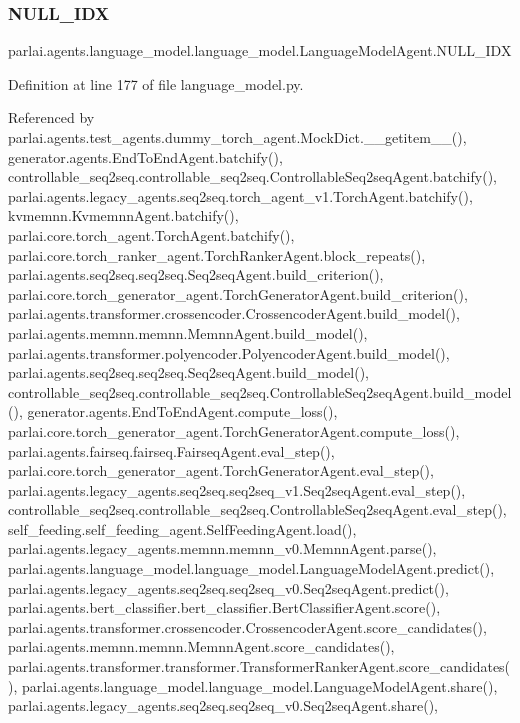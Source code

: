 \subsubsection{\texorpdfstring{N\+U\+L\+L\+\_\+\+I\+DX}{NULL\_IDX}}
{\footnotesize\ttfamily parlai.\+agents.\+language\+\_\+model.\+language\+\_\+model.\+Language\+Model\+Agent.\+N\+U\+L\+L\+\_\+\+I\+DX}



Definition at line 177 of file language\+\_\+model.\+py.



Referenced by parlai.\+agents.\+test\+\_\+agents.\+dummy\+\_\+torch\+\_\+agent.\+Mock\+Dict.\+\_\+\+\_\+getitem\+\_\+\+\_\+(), generator.\+agents.\+End\+To\+End\+Agent.\+batchify(), controllable\+\_\+seq2seq.\+controllable\+\_\+seq2seq.\+Controllable\+Seq2seq\+Agent.\+batchify(), parlai.\+agents.\+legacy\+\_\+agents.\+seq2seq.\+torch\+\_\+agent\+\_\+v1.\+Torch\+Agent.\+batchify(), kvmemnn.\+Kvmemnn\+Agent.\+batchify(), parlai.\+core.\+torch\+\_\+agent.\+Torch\+Agent.\+batchify(), parlai.\+core.\+torch\+\_\+ranker\+\_\+agent.\+Torch\+Ranker\+Agent.\+block\+\_\+repeats(), parlai.\+agents.\+seq2seq.\+seq2seq.\+Seq2seq\+Agent.\+build\+\_\+criterion(), parlai.\+core.\+torch\+\_\+generator\+\_\+agent.\+Torch\+Generator\+Agent.\+build\+\_\+criterion(), parlai.\+agents.\+transformer.\+crossencoder.\+Crossencoder\+Agent.\+build\+\_\+model(), parlai.\+agents.\+memnn.\+memnn.\+Memnn\+Agent.\+build\+\_\+model(), parlai.\+agents.\+transformer.\+polyencoder.\+Polyencoder\+Agent.\+build\+\_\+model(), parlai.\+agents.\+seq2seq.\+seq2seq.\+Seq2seq\+Agent.\+build\+\_\+model(), controllable\+\_\+seq2seq.\+controllable\+\_\+seq2seq.\+Controllable\+Seq2seq\+Agent.\+build\+\_\+model(), generator.\+agents.\+End\+To\+End\+Agent.\+compute\+\_\+loss(), parlai.\+core.\+torch\+\_\+generator\+\_\+agent.\+Torch\+Generator\+Agent.\+compute\+\_\+loss(), parlai.\+agents.\+fairseq.\+fairseq.\+Fairseq\+Agent.\+eval\+\_\+step(), parlai.\+core.\+torch\+\_\+generator\+\_\+agent.\+Torch\+Generator\+Agent.\+eval\+\_\+step(), parlai.\+agents.\+legacy\+\_\+agents.\+seq2seq.\+seq2seq\+\_\+v1.\+Seq2seq\+Agent.\+eval\+\_\+step(), controllable\+\_\+seq2seq.\+controllable\+\_\+seq2seq.\+Controllable\+Seq2seq\+Agent.\+eval\+\_\+step(), self\+\_\+feeding.\+self\+\_\+feeding\+\_\+agent.\+Self\+Feeding\+Agent.\+load(), parlai.\+agents.\+legacy\+\_\+agents.\+memnn.\+memnn\+\_\+v0.\+Memnn\+Agent.\+parse(), parlai.\+agents.\+language\+\_\+model.\+language\+\_\+model.\+Language\+Model\+Agent.\+predict(), parlai.\+agents.\+legacy\+\_\+agents.\+seq2seq.\+seq2seq\+\_\+v0.\+Seq2seq\+Agent.\+predict(), parlai.\+agents.\+bert\+\_\+classifier.\+bert\+\_\+classifier.\+Bert\+Classifier\+Agent.\+score(), parlai.\+agents.\+transformer.\+crossencoder.\+Crossencoder\+Agent.\+score\+\_\+candidates(), parlai.\+agents.\+memnn.\+memnn.\+Memnn\+Agent.\+score\+\_\+candidates(), parlai.\+agents.\+transformer.\+transformer.\+Transformer\+Ranker\+Agent.\+score\+\_\+candidates(), parlai.\+agents.\+language\+\_\+model.\+language\+\_\+model.\+Language\+Model\+Agent.\+share(), parlai.\+agents.\+legacy\+\_\+agents.\+seq2seq.\+seq2seq\+\_\+v0.\+Seq2seq\+Agent.\+share(), 